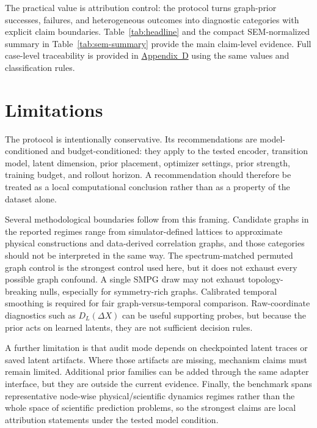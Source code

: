 \documentclass[preprint,12pt]{elsarticle}
\begin{document}
The practical value is attribution control: the protocol turns 
graph-prior successes, failures, and heterogeneous outcomes into 
diagnostic categories with explicit claim boundaries. Table~\ref{tab:headline} and the compact SEM-normalized summary in Table~\ref{tab:sem-summary} provide the main claim-level evidence. Full case-level traceability is provided in \hyperref[app:traceability]{Appendix~D} using the same values and classification rules.

\FloatBarrier

\section{Limitations}

The protocol is intentionally conservative. Its recommendations are model-conditioned and budget-conditioned: they apply to the tested encoder, transition model, latent dimension, prior placement, optimizer settings, prior strength, training budget, and rollout horizon. A recommendation should therefore be treated as a local computational conclusion rather than as a property of the dataset alone.

Several methodological boundaries follow from this framing. Candidate graphs in the reported regimes range from simulator-defined lattices to approximate physical constructions and data-derived correlation graphs, and those categories should not be interpreted in the same way. The spectrum-matched permuted graph control is the strongest control used here, but it does not exhaust every possible graph confound. A single SMPG draw may not exhaust topology-breaking nulls, especially for symmetry-rich graphs. Calibrated temporal smoothing is required for fair graph-versus-temporal comparison. Raw-coordinate diagnostics such as \(D_L(\Delta X)\) can be useful supporting probes, but because the prior acts on learned latents, they are not sufficient decision rules.

A further limitation is that audit mode depends on checkpointed latent traces or saved latent artifacts. Where those artifacts are missing, mechanism claims must remain limited. Additional prior families can be added through the same adapter interface, but they are outside the current evidence. Finally, the benchmark spans representative node-wise physical/scientific dynamics regimes rather than the whole space of scientific prediction problems, so the strongest claims are local attribution statements under the tested model condition.
\end{document}
